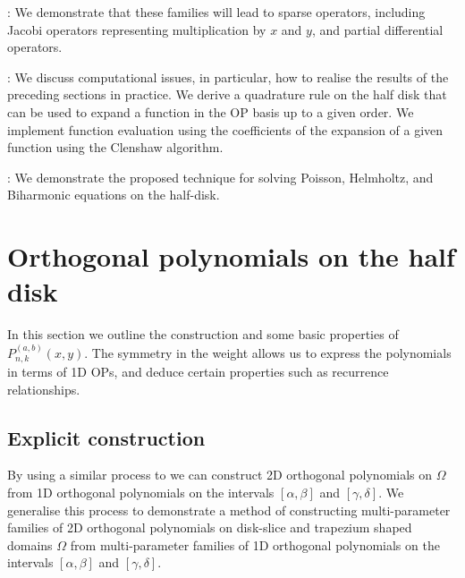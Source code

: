 \documentclass[11pt, oneside]{article}   	%
\begin{document}
\noindent{}: We demonstrate that these families will lead to sparse operators, including Jacobi operators representing multiplication by $x$ and $y$, and partial differential operators.

\noindent{}: We discuss computational issues, in particular, how to realise the results of the preceding sections in practice.  We  derive a quadrature rule on the half disk that can be used to expand a function in the OP basis up to a given order.  We implement function evaluation using the coefficients of the expansion of a given function using the Clenshaw algorithm.

\noindent{}: We demonstrate the proposed technique for solving Poisson, Helmholtz, and Biharmonic equations on the half-disk.  


\section{Orthogonal polynomials on the half disk}\label{Section:OPs}

In this section we outline the construction and some basic properties of $P_{n,k}^{(a,b)}(x,y)$. The symmetry in the weight allows us to express the polynomials in terms of 1D OPs, and deduce certain properties such as recurrence relationships. 

\subsection{Explicit construction}

By using a similar process to \cite[p55--56]{dunkl2014orthogonal} we can construct 2D orthogonal polynomials on $\Omega$ from 1D orthogonal polynomials on the intervals \([\alpha,\beta]\) and \([\gamma,\delta]\). We generalise this process to demonstrate a method of constructing multi-parameter families of 2D orthogonal polynomials on disk-slice and trapezium shaped domains $\Omega$ from multi-parameter families of 1D orthogonal polynomials on the intervals \([\alpha,\beta]\) and \([\gamma,\delta]\).
\end{document}

